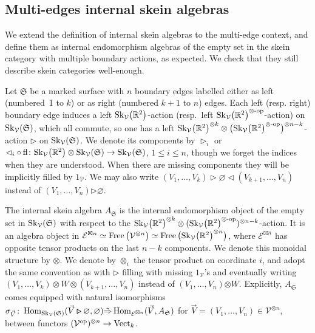 \documentclass[pdftex]{sigma}%
\numberwithin{equation}{section}
\newcommand{\Free}{\operatorname{Free}}
\newcommand{\Hom}{\operatorname{Hom}}
\newcommand{\bmrhd}{\bm{\triangleright}}
\newcommand{\bmotimes}{\bm{\otimes}}
\begin{document}
\subsection{Multi-edges internal skein algebras} We extend the definition of internal skein algebras to the multi-edge context, and define them as internal endomorphism algebras of the empty set in the skein category with multiple boundary actions, as expected. We check that they still describe skein categories well-enough.
\begin{Definition}\label{defMultiEdgeASigma}
Let $\mathfrak{S}$ be a marked surface with $n$ boundary edges labelled either as left (numbe\-red~1 to $k$) or as right (numbered $k+1$ to $n$) edges. Each left (resp. right) boundary edge induces a left ${\rm Sk}_\mathcal{V}\big(\mathbb{R}^2\big)$-action (resp.~left ${\rm Sk}_\mathcal{V}\big(\mathbb{R}^2\big)^{\otimes\text{-}{\rm op}}$-action) on ${\rm Sk}_\mathcal{V}(\mathfrak{S})$, which all commute, so one has a left ${\rm Sk}_\mathcal{V}\big(\mathbb{R}^2\big)^{\otimes k}\otimes \big({\rm Sk}_\mathcal{V}\big(\mathbb{R}^2\big)^{\otimes\text{-}{\rm op}}\big)^{\otimes n-k}$-action $\bmrhd$ on ${\rm Sk}_\mathcal{V}(\mathfrak{S})$. We denote its components by $\rhd_i$ or $\lhd_i\circ \operatorname{fl}\colon {\rm Sk}_\mathcal{V}\big(\mathbb{R}^2\big) \otimes {\rm Sk}_\mathcal{V}(\mathfrak{S})\to {\rm Sk}_\mathcal{V}(\mathfrak{S})$, $1\leq i\leq n$, though we forget the indices when they are understood. When there are missing components they will be implicitly filled by $1_\mathcal{V}$. We may also write $(V_1 , \dots , V_k){\rhd} \varnothing \lhd (V_{k+1},\dots,V_n)$ instead of $(V_1 , \dots , V_n)\bmrhd \varnothing$.

The internal skein algebra $A_\mathfrak{S}$ is the internal endomorphism object of the empty set in ${\rm Sk}_\mathcal{V}(\mathfrak{S})$ with respect to the ${\rm Sk}_\mathcal{V}\big(\mathbb{R}^2\big)^{\otimes k}\otimes ({\rm Sk}_\mathcal{V}\big(\mathbb{R}^2\big)^{\otimes\text{-}{\rm op}})^{\otimes n-k}$-action. It is an algebra object in $\mathcal{E}^{\boxtimes n} \simeq \Free\big(\mathcal{V}^{\otimes n}\big) \simeq \Free\big({\rm Sk}_\mathcal{V}\big(\mathbb{R}^2\big)^{\otimes n}\big)$, where $\mathcal{E}^{\boxtimes n}$ has opposite tensor products on the last $n-k$ components. We denote this monoidal structure by $\bmotimes$. We denote by $\otimes_i$ the tensor product on coordinate $i$, and adopt the same convention as with $\bmrhd$ filling with missing $1_\mathcal{V}$'s and eventually writing $(V_1 , \dots , V_k)\otimes W \otimes (V_{k+1},\dots,V_n)$ instead of $(V_1 , \dots , V_n)\bmotimes W$.
Explicitly, $A_\mathfrak{S}$ comes equipped with natural isomorphisms $\sigma_{\vec{V}}\colon \Hom_{{\rm Sk}_\mathcal{V}(\mathfrak{S})}(\vec{V} \bmrhd \varnothing, \varnothing) \tilde{\Rightarrow} \Hom_{\mathcal{E}^{\boxtimes n}}(\vec{V} , A_\mathfrak{S})$ for \mbox{$\vec{V} = (V_1,\dots,V_n) \in \mathcal{V}^{\otimes n}$}, between functors $(\mathcal{V}^{\rm op})^{\otimes n}\allowbreak\to {\rm Vect}_k$.
\end{Definition}
\end{document}
